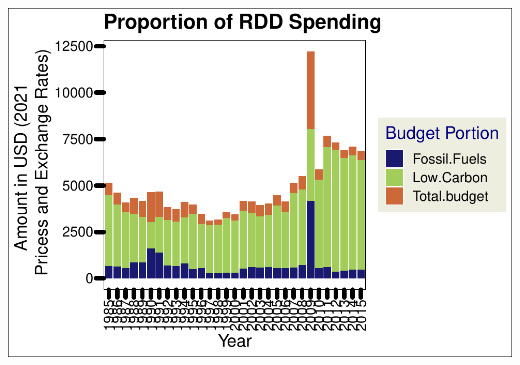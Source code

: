 \documentclass[
  12pt,
]{article}
\begin{document}
\includegraphics{Chang_Jenkins_Mullens_ENV872_Final_files/figure-latex/Combined bar plot of US RDD-1.pdf}
\end{document}
